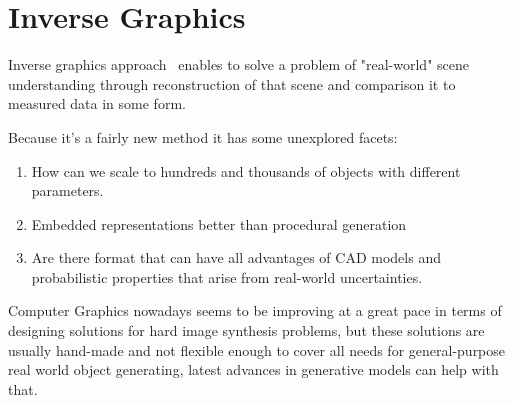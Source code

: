 \section{Inverse Graphics}

Inverse graphics approach~\cite{rezende2016unsupervised,eslami2016attend,kulkarni2015deep,Izadinia_2017_CVPR} enables to solve a problem of "real-world" scene understanding through reconstruction of that scene and comparison it to measured data in some form.

Because it's a fairly new method it has some unexplored facets:
\begin{enumerate}
    \item How can we scale to hundreds and thousands of objects with different parameters.
    \item Embedded representations better than procedural generation
    \item Are there format that can have all advantages of CAD models and probabilistic properties that arise from real-world uncertainties.
\end{enumerate}







Computer Graphics nowadays seems to be improving at a great pace in terms of designing solutions for hard image synthesis problems, but these solutions are usually hand-made and not flexible enough to cover all needs for general-purpose real world object generating, latest advances in generative models can help with that.

